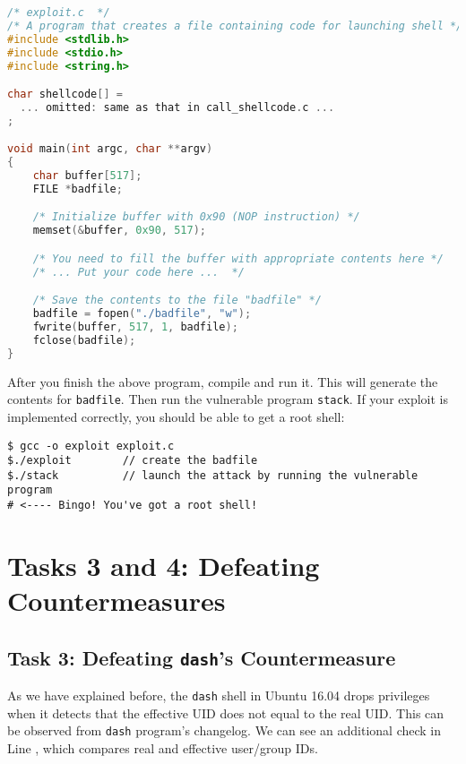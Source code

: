 \begin{lstlisting}[language=C]
/* exploit.c  */
/* A program that creates a file containing code for launching shell */
#include <stdlib.h>
#include <stdio.h>
#include <string.h>

char shellcode[] =
  ... omitted: same as that in call_shellcode.c ...
;							        

void main(int argc, char **argv)
{
    char buffer[517];
    FILE *badfile;

    /* Initialize buffer with 0x90 (NOP instruction) */
    memset(&buffer, 0x90, 517);

    /* You need to fill the buffer with appropriate contents here */ 
    /* ... Put your code here ...  */

    /* Save the contents to the file "badfile" */
    badfile = fopen("./badfile", "w");
    fwrite(buffer, 517, 1, badfile);
    fclose(badfile);
}
\end{lstlisting}
 
After you finish the above program, compile and run it. This will generate
the contents for \texttt{badfile}. Then run the vulnerable 
program {\tt stack}. If your exploit is implemented correctly, you should 
be able to get a root shell:  

\begin{lstlisting}
$ gcc -o exploit exploit.c
$./exploit        // create the badfile
$./stack          // launch the attack by running the vulnerable program
# <---- Bingo! You've got a root shell! 
\end{lstlisting}


\section{Tasks 3 and 4: Defeating Countermeasures}

\subsection{Task 3: Defeating \texttt{dash}'s Countermeasure}

As we have explained before, the \texttt{dash} shell in Ubuntu 16.04 drops privileges 
when it detects that the effective UID does not equal to the real UID.
This can be observed from \texttt{dash} program's changelog.
We can see an additional check in Line , which
compares real and effective user/group IDs.



